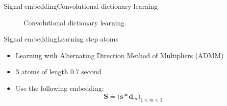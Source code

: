 \documentclass[9pt,t,aspectratio=1610]{beamer}
\newcommand{\ratio}{0.5}
\newcommand{\bfs}{\mathbf{s}}
\newcommand{\bfS}{\mathbf{S}}
\newcommand{\bfd}{\mathbf{d}}
\begin{document}
\begin{frame}{Signal embedding}{Convolutional dictionary learning}
\begin{minipage}[t]{0.4\linewidth}
\begin{figure}[h]
        \caption{Convolutional dictionary learning.}
        \label{fig:walk_class_ex_stepboxes}
    \end{figure}
\end{minipage}

\end{frame}

\begin{frame}{Signal embedding}{Learning step atoms}

\renewcommand{\ratio}{0.9}
\centering
\begin{minipage}[t]{0.45\linewidth}
\begin{itemize}
    \item Learning with Alternating Direction Method of Multipliers (ADMM) \cite{bristow2013fast}
        \item 3 atoms of length 0.7 second

    \pause[3]
    \item Use the following embedding:
\begin{equation*}\label{eq: convolutional embedding}
\bfS \doteq \Big( \bfs * \bfd_m\Big)_{1 \le m \le 3 }
\end{equation*}
        
\end{itemize}


\end{minipage}
\end{frame}
\end{document}
